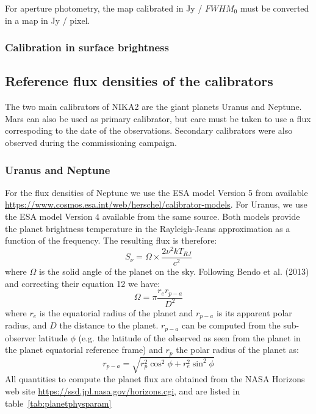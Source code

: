 For aperture photometry, the map calibrated in Jy / $FWHM_{0}$ must be
converted in a map in Jy / pixel. 

\subsubsection{Calibration in surface brightness}






 


\subsection{Reference flux densities of the calibrators}

The two main calibrators of NIKA2 are the giant planets Uranus and
Neptune. Mars can also be used as primary calibrator, but care must be
taken to use a flux correspoding to the date of the
observations. Secondary calibrators were also observed during the
commissioning campaign. 

\subsubsection{Uranus and Neptune}
For the flux densities of Neptune we use the ESA model Version 5 from
available  \url{https://www.cosmos.esa.int/web/herschel/calibrator-models}. For
Uranus, we use the ESA model Version 4 available from the same
source.  Both models provide the planet brightness temperature in the
Rayleigh-Jeans approximation as a function of the frequency. The
resulting flux is therefore: 
\begin{equation}
S_{\nu} = \Omega \times \frac{2 \nu^{2} k T_{RJ}}{c^2}
\end{equation}
where $\Omega$ is the solid angle of the planet on the sky. Following
Bendo et al. (2013) and correcting their equation 12 we have:
\begin{equation}
\Omega = \pi \frac{r_{e} r_{p-a}}{D^{2}} 
\label{eq:omega}
\end{equation}
where $r_{e}$ is the equatorial radius of the planet and $r_{p-a}$ is
its apparent polar radius, and $D$ the distance to the
planet. $r_{p-a}$ can be computed from the sub-observer latitude $\phi$
(e.g. the latitude of the observed as seen from the planet in the
planet equatorial reference frame) and $r_{p}$ the polar radius of the
planet as:
\begin{equation}
r_{p-a} = \sqrt{r_{p}^2 \cos^{2}\phi + r_{e}^2 \sin^{2} \phi}
\end{equation}
All quantities to compute the planet flux are obtained from the NASA
Horizons web site \url{https://ssd.jpl.nasa.gov/horizons.cgi}, and are
listed in table~\ref{tab:planetphysparam}

